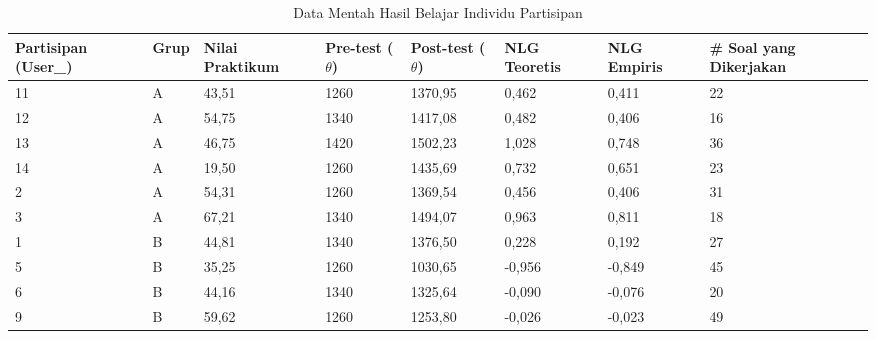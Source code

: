 \begin{table}[!ht]
    \centering
    \caption{Data Mentah Hasil Belajar Individu Partisipan}
    \label{tbl:nlg_individu}
    \begin{tabular}{|p{1.8cm}|p{1cm}|p{1.5cm}|p{1.5cm}|p{1.5cm}|p{1.3cm}|p{1.3cm}|p{1.8cm}|}
        \hline
        \textbf{Partisipan (User\_)} & \textbf{Grup} & \textbf{Nilai Praktikum} & \textbf{Pre-test ($\theta$)} & \textbf{Post-test ($\theta$)} & \textbf{NLG Teoretis} & \textbf{NLG Empiris} & \textbf{\# Soal yang Dikerjakan} \\
        \hline
        \hline
        11 & A & 43,51 & 1260 & 1370,95 & 0,462 & 0,411 & 22 \\
        \hline
        12 & A & 54,75 & 1340 & 1417,08 & 0,482 & 0,406 & 16 \\
        \hline
        13 & A & 46,75 & 1420 & 1502,23 & 1,028 & 0,748 & 36 \\
        \hline
        14 & A & 19,50 & 1260 & 1435,69 & 0,732 & 0,651 & 23 \\
        \hline
        2  & A & 54,31 & 1260 & 1369,54 & 0,456 & 0,406 & 31\\
        \hline
        3  & A & 67,21 & 1340 & 1494,07 & 0,963 & 0,811 & 18 \\
        \hline
        \hline
        1  & B & 44,81 & 1340 & 1376,50 & 0,228 & 0,192 & 27 \\
        \hline
        5  & B & 35,25 & 1260 & 1030,65 & -0,956 & -0,849 & 45\\
        \hline
        6  & B & 44,16 & 1340 & 1325,64 & -0,090 & -0,076 & 20 \\
        \hline
        9  & B & 59,62 & 1260 & 1253,80 & -0,026 & -0,023 & 49 \\
        \hline
    \end{tabular}
\end{table}